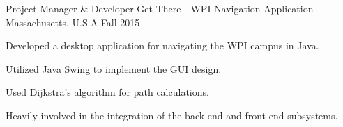 \begin{cventries}
{\begin{cvitems}
      \end{cvitems}
     }
    \cventry
   	{Project Manager \& Developer}
   	{Get There - WPI Navigation Application}
   	{Massachusetts, U.S.A}
   	{Fall 2015}
   	{
      \begin{cvitems}
        \item {Developed a desktop application for navigating the WPI campus in Java.}
        \item {Utilized Java Swing to implement the GUI design.}
        \item{Used Dijkstra's algorithm for path calculations.}
        \item{Heavily involved in the integration of the back-end and front-end subsystems.}
      \end{cvitems}
    }
\end{cventries}

%     